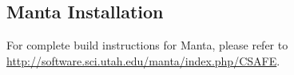 \documentclass[12pt]{article}
\begin{document}








\subsection{Manta Installation}

For complete build instructions for Manta, please refer to
\url{http://software.sci.utah.edu/manta/index.php/CSAFE}.  
\end{document}
